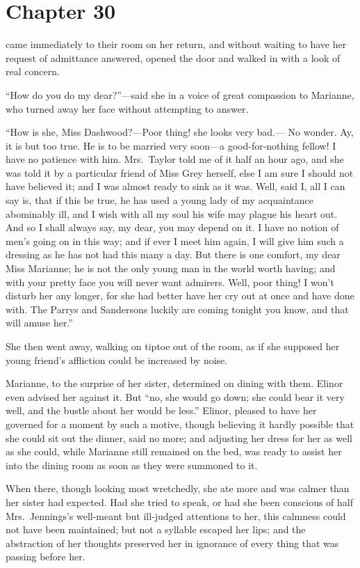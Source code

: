\chapter{Chapter 30}


 came immediately to their room on her return,
and without waiting to have her request of admittance answered,
opened the door and walked in with a look of real concern.

``How do you do my dear?''---said she in a voice of great
compassion to Marianne, who turned away her face without
attempting to answer.

``How is she, Miss Dashwood?---Poor thing! she looks very bad.---%
No wonder.  Ay, it is but too true.  He is to be married
very soon---a good-for-nothing fellow!  I have no patience
with him.  Mrs.\ Taylor told me of it half an hour ago,
and she was told it by a particular friend of Miss
Grey herself, else I am sure I should not have believed it;
and I was almost ready to sink as it was.  Well, said I,
all I can say is, that if this be true, he has used
a young lady of my acquaintance abominably ill, and I
wish with all my soul his wife may plague his heart out.
And so I shall always say, my dear, you may depend on it.
I have no notion of men's going on in this way; and if ever
I meet him again, I will give him such a dressing as he
has not had this many a day.  But there is one comfort,
my dear Miss Marianne; he is not the only young man
in the world worth having; and with your pretty face
you will never want admirers.  Well, poor thing!  I won't
disturb her any longer, for she had better have her cry
out at once and have done with.  The Parrys and Sandersons
luckily are coming tonight you know, and that will amuse her.''

She then went away, walking on tiptoe out of the room,
as if she supposed her young friend's affliction could
be increased by noise.

Marianne, to the surprise of her sister,
determined on dining with them.  Elinor even advised
her against it.  But ``no, she would go down; she could
bear it very well, and the bustle about her would
be less.''  Elinor, pleased to have her governed for a
moment by such a motive, though believing it hardly
possible that she could sit out the dinner, said no more;
and adjusting her dress for her as well as she could,
while Marianne still remained on the bed, was ready
to assist her into the dining room as soon as they were
summoned to it.

When there, though looking most wretchedly,
she ate more and was calmer than her sister had expected.
Had she tried to speak, or had she been conscious of half
Mrs.\ Jennings's well-meant but ill-judged attentions
to her, this calmness could not have been maintained;
but not a syllable escaped her lips; and the abstraction
of her thoughts preserved her in ignorance of every thing
that was passing before her.

